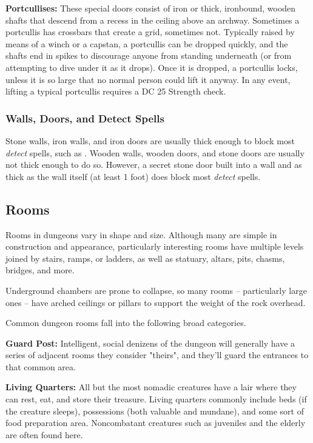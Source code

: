 \textbf{Portcullises:} These special doors consist of iron or thick, ironbound, wooden shafts that descend from a recess in the ceiling above an archway. Sometimes a portcullis has crossbars that create a grid, sometimes not. Typically raised by means of a winch or a capstan, a portcullis can be dropped quickly, and the shafts end in spikes to discourage anyone from standing underneath (or from attempting to dive under it as it drops). Once it is dropped, a portcullis locks, unless it is so large that no normal person could lift it anyway. In any event, lifting a typical portcullis requires a DC 25 Strength check.

\subsubsection{Walls, Doors, and Detect Spells}

Stone walls, iron walls, and iron doors are usually thick enough to block most \textit{detect} spells, such as . Wooden walls, wooden doors, and stone doors are usually not thick enough to do so. However, a secret stone door built into a wall and as thick as the wall itself (at least 1 foot) does block most \textit{detect} spells.

\subsection{Rooms}

Rooms in dungeons vary in shape and size. Although many are simple in construction and appearance, particularly interesting rooms have multiple levels joined by stairs, ramps, or ladders, as well as statuary, altars, pits, chasms, bridges, and more.

Underground chambers are prone to collapse, so many rooms -- particularly large ones -- have arched ceilings or pillars to support the weight of the rock overhead.

Common dungeon rooms fall into the following broad categories. 

\textbf{Guard Post:} Intelligent, social denizens of the dungeon will generally have a series of adjacent rooms they consider "theirs", and they'll guard the entrances to that common area. 

\textbf{Living Quarters:} All but the most nomadic creatures have a lair where they can rest, eat, and store their treasure. Living quarters commonly include beds (if the creature sleeps), possessions (both valuable and mundane), and some sort of food preparation area. Noncombatant creatures such as juveniles and the elderly are often found here.

